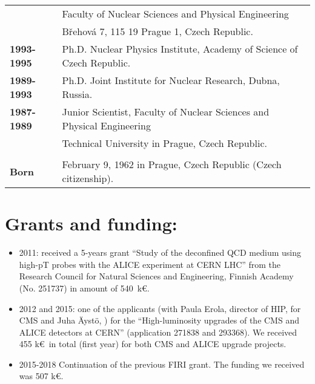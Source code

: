 \documentclass[12pt]{article}
\begin{document}
\begin{tabular}{ll}
				& Faculty of Nuclear Sciences and Physical Engineering \\
				& B\v{r}ehov\'a 7, 115 19 Prague 1, Czech Republic.\\
{\bf 1993-1995} 	& Ph.D. Nuclear Physics Institute, Academy of Science of Czech Republic.\\
{\bf 1989-1993} 	& Ph.D. Joint Institute for Nuclear Research, Dubna, Russia.\\
{\bf 1987-1989} 	& Junior Scientist, Faculty of Nuclear Sciences and Physical Engineering\\
				& Technical University in Prague, Czech Republic.\\
\\
{\bf Born} 	& February 9, 1962 in Prague, Czech Republic (Czech citizenship).\\
				
\end{tabular}


\clearpage

\section{Grants and funding:}
\begin{itemize}
\item 2011: received a 5-years grant ``Study of the deconfined QCD medium using high-pT probes with the ALICE experiment at
CERN LHC'' from the Research Council for Natural Sciences and Engineering, Finnish Academy 
(No. 251737) in amount of 540~k\euro. 

\item 2012 and 2015: one of the applicants (with Paula Erola, director of HIP, for CMS and Juha \"Ayst\"o, ) for the ``High-luminosity upgrades of the CMS and ALICE detectors at CERN'' (application 271838 and 293368). We received 455 k\euro\ in total (first year) for both CMS and ALICE upgrade projects. 

\item 2015-2018 Continuation of the previous FIRI grant. The funding we received was 507 k\euro.
\end{itemize}
\end{document}
